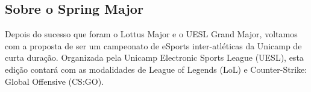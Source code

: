 \subsection{Sobre o Spring Major}

Depois do sucesso que foram o Lottus Major e o UESL Grand Major, voltamos com a proposta de ser um campeonato de eSports inter-atléticas da Unicamp de curta duração. Organizada pela Unicamp Electronic Sports League (UESL), esta edição contará com as modalidades de League of Legends (LoL) e Counter-Strike: Global Offensive (CS:GO).
